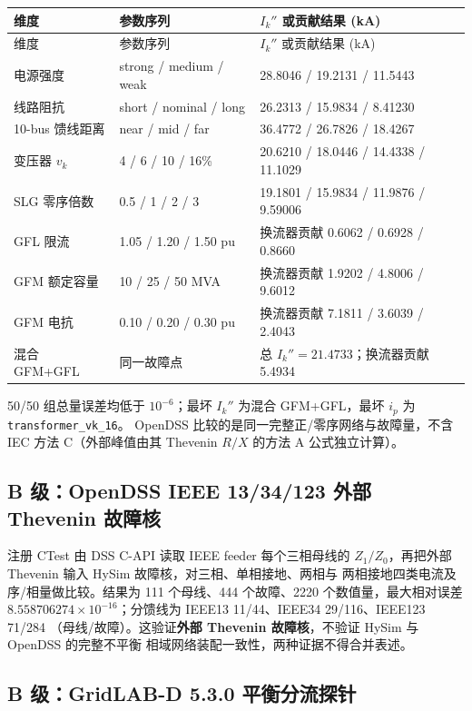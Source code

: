 \begin{center}\footnotesize
\begin{longtable}{@{}L{3.3cm}L{5.2cm}L{5.7cm}@{}}
\toprule
维度 & 参数序列 & $I_k''$ 或贡献结果 (kA)\\
\midrule
\endfirsthead
\toprule
维度 & 参数序列 & $I_k''$ 或贡献结果 (kA)\\
\midrule
\endhead
电源强度 & strong / medium / weak & 28.8046 / 19.2131 / 11.5443\\
线路阻抗 & short / nominal / long & 26.2313 / 15.9834 / 8.41230\\
10-bus 馈线距离 & near / mid / far & 36.4772 / 26.7826 / 18.4267\\
变压器 $v_k$ & 4 / 6 / 10 / 16\% & 20.6210 / 18.0446 / 14.4338 / 11.1029\\
SLG 零序倍数 & 0.5 / 1 / 2 / 3 & 19.1801 / 15.9834 / 11.9876 / 9.59006\\
GFL 限流 & 1.05 / 1.20 / 1.50 pu & 换流器贡献 0.6062 / 0.6928 / 0.8660\\
GFM 额定容量 & 10 / 25 / 50 MVA & 换流器贡献 1.9202 / 4.8006 / 9.6012\\
GFM 电抗 & 0.10 / 0.20 / 0.30 pu & 换流器贡献 7.1811 / 3.6039 / 2.4043\\
混合 GFM+GFL & 同一故障点 & 总 $I_k''=21.4733$；换流器贡献 5.4934\\
\bottomrule
\end{longtable}
\end{center}

50/50 组总量误差均低于 $10^{-6}$；最坏 $I_k''$ 为混合 GFM+GFL，最坏 $i_p$ 为
\texttt{transformer\_vk\_16}。
OpenDSS 比较的是同一完整正/零序网络与故障量，不含 IEC 方法 C（外部峰值由其 Thevenin
$R/X$ 的方法 A 公式独立计算）。

\subsection{B 级：OpenDSS IEEE 13/34/123 外部 Thevenin 故障核}

注册 CTest  由 DSS C-API 读取 IEEE feeder
每个三相母线的 $Z_1/Z_0$，再把外部 Thevenin 输入 HySim 故障核，对三相、单相接地、两相与
两相接地四类电流及序/相量做比较。结果为 111 个母线、444 个故障、2220 个数值量，最大相对误差
$8.558706274\times10^{-16}$；分馈线为 IEEE13 11/44、IEEE34 29/116、IEEE123 71/284
（母线/故障）。这验证\textbf{外部 Thevenin 故障核}，不验证 HySim 与 OpenDSS 的完整不平衡
相域网络装配一致性，两种证据不得合并表述。

\subsection{B 级：GridLAB-D 5.3.0 平衡分流探针}

